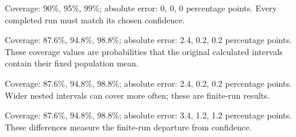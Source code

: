 \begin{answeroptions}
\item Coverage: 90\%, 95\%, 99\%; absolute error: 0, 0, 0 percentage points. Every completed run must match its chosen confidence.
\item Coverage: 87.6\%, 94.8\%, 98.8\%; absolute error: 2.4, 0.2, 0.2 percentage points. These coverage values are probabilities that the original calculated intervals contain their fixed population mean.
\item Coverage: 87.6\%, 94.8\%, 98.8\%; absolute error: 2.4, 0.2, 0.2 percentage points. Wider nested intervals can cover more often; these are finite-run results.
\item Coverage: 87.6\%, 94.8\%, 98.8\%; absolute error: 3.4, 1.2, 1.2 percentage points. These differences measure the finite-run departure from confidence.
\end{answeroptions}
\clearpage
